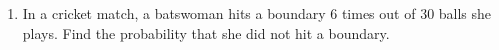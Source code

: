 \renewcommand{\theequation}{\theenumi}
\begin{enumerate}[label=\arabic*.,ref=\thesubsection.\theenumi]
\item In a cricket match, a batswoman hits a boundary 6 times out of 30 balls she plays. Find the probability that she did not hit a boundary.
\end{enumerate}